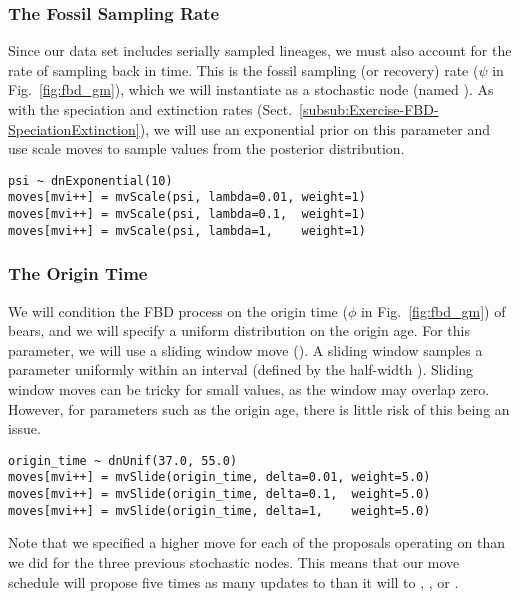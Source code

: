 \subsubsection{The Fossil Sampling Rate}\label{subsub:Exercise-FBD-Psi}

Since our data set includes serially sampled lineages, we must also account for the rate of sampling back in time. 
This is the fossil sampling (or recovery) rate ($\psi$ in Fig.\ \ref{fig:fbd_gm}), which we will instantiate as a stochastic node (named ). 
As with the speciation and extinction rates (Sect.\ \ref{subsub:Exercise-FBD-SpeciationExtinction}), we will use an exponential prior on this parameter and use scale moves to sample values from the posterior distribution.
{\tt \begin{snugshade*}
\begin{lstlisting}
psi ~ dnExponential(10) 
moves[mvi++] = mvScale(psi, lambda=0.01, weight=1)
moves[mvi++] = mvScale(psi, lambda=0.1,  weight=1)
moves[mvi++] = mvScale(psi, lambda=1,    weight=1)
\end{lstlisting}
\end{snugshade*}}

\subsubsection{The Origin Time}\label{subsub:Exercise-FBD-Origin}

We will condition the FBD process on the origin time ($\phi$ in Fig.\ \ref{fig:fbd_gm}) of bears, and we will specify a uniform distribution on the origin age.
For this parameter, we will use a sliding window move ().
A sliding window samples a parameter uniformly within an interval (defined by the half-width ). 
Sliding window moves can be tricky for small values, as the window may overlap zero. 
However, for parameters such as the origin age, there is little risk of this being an issue.

{\tt \begin{snugshade*}
\begin{lstlisting}
origin_time ~ dnUnif(37.0, 55.0)
moves[mvi++] = mvSlide(origin_time, delta=0.01, weight=5.0)
moves[mvi++] = mvSlide(origin_time, delta=0.1,  weight=5.0)
moves[mvi++] = mvSlide(origin_time, delta=1,    weight=5.0)
\end{lstlisting}
\end{snugshade*}}

Note that we specified a higher move  for each of the proposals operating on  than we did for the three previous stochastic nodes.
This means that our move schedule will propose five times as many updates to  than it will to , , or . 

